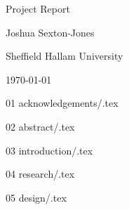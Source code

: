 \documentclass{report}
\begin{document}
\begin{titlepage}
  \begin{center}
    \setlength\parskip{1ex}

    \null

    \vfill

    { \huge Project Report }

    Joshua Sexton-Jones

    \vfill

    Sheffield Hallam University

    \today \end{center} \end{titlepage}


{01 acknowledgements/.tex} \clearpage


{02 abstract/.tex} \clearpage

\tableofcontents \clearpage

\printglossary[title=Terminology] \clearpage


{03 introduction/.tex} \clearpage


{04 research/.tex} \clearpage


{05 design/.tex} \clearpage

\printbibliography \clearpage
\end{document}
